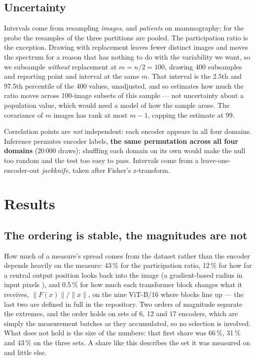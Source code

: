 \documentclass{esannV2}
\begin{document}
\subsection{Uncertainty}

Intervals come from resampling \emph{images}, and \emph{patients} on
mammography; for the probe the resamples of the three partitions are pooled.
The participation ratio is the exception. Drawing with replacement leaves
fewer distinct images and moves the spectrum for a reason that has nothing to
do with the variability we want, so we subsample \emph{without} replacement at
$m = n/2 = 100$, drawing 400 subsamples and reporting point and interval at the
same $m$. That interval is the 2.5th and 97.5th percentile of the 400 values,
unadjusted, and so estimates how much the ratio moves across 100-image subsets
of this sample --- not uncertainty about a population value, which would need a
model of how the sample arose. The covariance of $m$ images has rank at most
$m-1$, capping the estimate at 99.

Correlation points are \emph{not} independent: each encoder appears in all four
domains. Inference permutes encoder labels, \textbf{the same permutation across
all four domains} (20\,000 draws); shuffling each domain on its own would make
the null too random and the test too easy to pass. Intervals come from a
leave-one-encoder-out \emph{jackknife}, taken after Fisher's z-transform.

\section{Results}

\subsection{The ordering is stable, the magnitudes are not}

How much of a measure's spread comes from the dataset rather than the encoder
depends heavily on the measure: 43\,\% for the participation ratio, 12\,\% for
how far a central output position looks back into the image (a gradient-based
radius in input pixels \cite{Luo}), and 0.5\,\% for how much each transformer
block changes what it receives, $\|F(x)\|/\|x\|$, on the nine ViT-B/16 where
blocks line up --- the last two are defined in full in the repository. Two
orders of magnitude separate the extremes, and the order holds on sets of 6, 12
and 17 encoders, which are simply the measurement batches as they accumulated,
so no selection is involved. What does not hold is the size of the numbers:
that first share was 66\,\%, 31\,\% and 43\,\% on the three sets. A share
like this describes the set it was measured on and little else.
\end{document}
